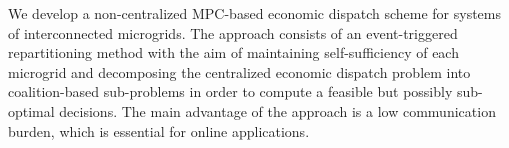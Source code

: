 We develop a non-centralized MPC-based economic dispatch scheme for systems of interconnected microgrids. The approach consists of an event-triggered repartitioning method with the aim of maintaining self-sufficiency of each microgrid and decomposing the centralized economic dispatch problem into coalition-based sub-problems in order to compute a feasible but possibly sub-optimal decisions. The main advantage of the approach is a low communication burden, which is essential for online applications. %
